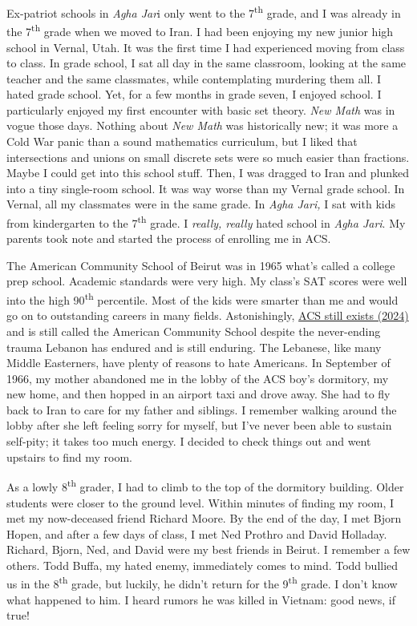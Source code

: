 Ex-patriot schools in \emph{Agha Jar}i only went to the
7\textsuperscript{th} grade, and I was already in the
7\textsuperscript{th} grade when we moved to Iran. I had been enjoying
my new junior high school in Vernal, Utah. It was the first time I had
experienced moving from class to class. In grade school, I sat all day
in the same classroom, looking at the same teacher and the same
classmates, while contemplating murdering them all. I hated grade
school. Yet, for a few months in grade seven, I enjoyed school. I
particularly enjoyed my first encounter with basic set theory. \emph{New
Math} was in vogue those days. Nothing about \emph{New Math} was
historically new; it was more a Cold War panic than a sound mathematics
curriculum, but I liked that intersections and unions on small discrete
sets were so much easier than fractions. Maybe I could get into this
school stuff. Then, I was dragged to Iran and plunked into a tiny
single-room school. It was way worse than my Vernal grade school. In
Vernal, all my classmates were in the same grade. In \emph{Agha Jari,} I
sat with kids from kindergarten to the 7\textsuperscript{th} grade. I
\emph{really, really} hated school in \emph{Agha Jari}. My parents took
note and started the process of enrolling me in ACS.

The American Community School of Beirut was in 1965 what's called a
college prep school. Academic standards were very high. My class's SAT
scores were well into the high 90\textsuperscript{th} percentile. Most
of the kids were smarter than me and would go on to outstanding careers
in many fields. Astonishingly, \href{https://www.acs.edu.lb/}{ACS still
exists (2024)} and is still called the American Community School despite
the never-ending trauma Lebanon has endured and is still enduring. The
Lebanese, like many Middle Easterners, have plenty of reasons to hate
Americans. In September of 1966, my mother abandoned me in the lobby of
the ACS boy's dormitory, my new home, and then hopped in an airport taxi
and drove away. She had to fly back to Iran to care for my father and
siblings. I remember walking around the lobby after she left feeling
sorry for myself, but I've never been able to sustain self-pity; it
takes too much energy. I decided to check things out and went upstairs
to find my room.

As a lowly 8\textsuperscript{th} grader, I had to climb to the top of
the dormitory building. Older students were closer to the ground level.
Within minutes of finding my room, I met my now-deceased friend Richard
Moore. By the end of the day, I met Bjorn Hopen, and after a few days of
class, I met Ned Prothro and David Holladay. Richard, Bjorn, Ned, and
David were my best friends in Beirut. I remember a few others. Todd
Buffa, my hated enemy, immediately comes to mind. Todd bullied us in the
8\textsuperscript{th} grade, but luckily, he didn't return for the
9\textsuperscript{th} grade. I don't know what happened to him. I heard
rumors he was killed in Vietnam: good news, if true!~

